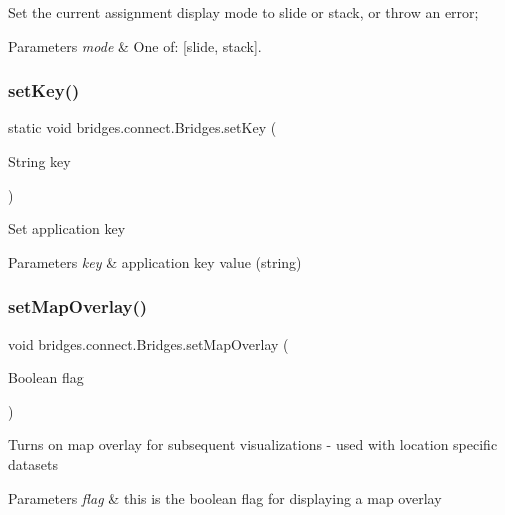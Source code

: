 Set the current assignment display mode to slide or stack, or throw an error; 
\begin{DoxyParams}{Parameters}
{\em mode} & One of\+: \mbox{[}\textquotesingle{}slide\textquotesingle{}, \textquotesingle{}stack\textquotesingle{}\mbox{]}. \\
\hline
\end{DoxyParams}
\mbox{\label{classbridges_1_1connect_1_1_bridges_ab69e89ec7d2e674a8b8c4b0be0c63397}} 
\subsubsection{\texorpdfstring{setKey()}{setKey()}}
{\footnotesize\ttfamily static void bridges.\+connect.\+Bridges.\+set\+Key (\begin{DoxyParamCaption}\item[{String}]{key }\end{DoxyParamCaption})\hspace{0.3cm}{\ttfamily [static]}}

Set application key


\begin{DoxyParams}{Parameters}
{\em key} & application key value (string) \\
\hline
\end{DoxyParams}
\mbox{\label{classbridges_1_1connect_1_1_bridges_a4af383ba2f114ad7bd4e08eb44096973}} 
\subsubsection{\texorpdfstring{setMapOverlay()}{setMapOverlay()}}
{\footnotesize\ttfamily void bridges.\+connect.\+Bridges.\+set\+Map\+Overlay (\begin{DoxyParamCaption}\item[{Boolean}]{flag }\end{DoxyParamCaption})}

Turns on map overlay for subsequent visualizations -\/ used with location specific datasets


\begin{DoxyParams}{Parameters}
{\em flag} & this is the boolean flag for displaying a map overlay \\
\hline
\end{DoxyParams}
\mbox{\label{classbridges_1_1connect_1_1_bridges_ab43e412448e1dfc340e58c407519a576}} 

